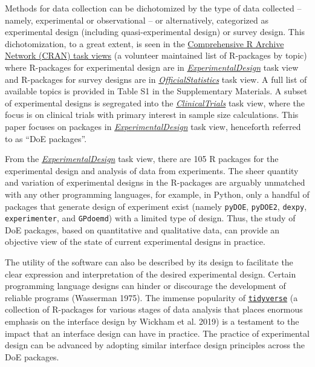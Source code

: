 \documentclass{article}
\begin{document}
Methods for data collection can be dichotomized by the type of data
collected -- namely, experimental or observational -- or alternatively,
categorized as experimental design (including quasi-experimental design)
or survey design. This dichotomization, to a great extent, is seen in
the \href{https://cran.r-project.org/web/views/}{Comprehensive R Archive
Network (CRAN) task views} (a volunteer maintained list of R-packages by
topic) where R-packages for experimental design are in
\href{http://CRAN.R-project.org/view=ExperimentalDesign}{\emph{ExperimentalDesign}}
task view and R-packages for survey designs are in
\href{http://CRAN.R-project.org/view=OfficialStatistics}{\emph{OfficialStatistics}}
task view. A full list of available topics is provided in Table S1 in
the Supplementary Materials. A subset of experimental designs is
segregated into the
\href{http://CRAN.R-project.org/view=ClinicalTrials}{\emph{ClinicalTrials}}
task view, where the focus is on clinical trials with primary interest
in sample size calculations. This paper focuses on packages in
\href{http://CRAN.R-project.org/view=ExperimentalDesign}{\emph{ExperimentalDesign}}
task view, henceforth referred to as ``DoE packages''.

From the
\href{http://CRAN.R-project.org/view=ExperimentalDesign}{\emph{ExperimentalDesign}}
task view, there are 105 R packages for the experimental design and
analysis of data from experiments. The sheer quantity and variation of
experimental designs in the R-packages are arguably unmatched with any
other programming languages, for example, in Python, only a handful of
packages that generate design of experiment exist (namely
\texttt{pyDOE}, \texttt{pyDOE2}, \texttt{dexpy}, \texttt{experimenter},
and \texttt{GPdoemd}) with a limited type of design. Thus, the study of
DoE packages, based on quantitative and qualitative data, can provide an
objective view of the state of current experimental designs in practice.

The utility of the software can also be described by its design to
facilitate the clear expression and interpretation of the desired
experimental design. Certain programming language designs can hinder or
discourage the development of reliable programs (Wasserman 1975). The
immense popularity of
\href{https://cran.r-project.org/web/packages/tidyverse/index.html}{\texttt{tidyverse}}
(a collection of R-packages for various stages of data analysis that
places enormous emphasis on the interface design by Wickham et al. 2019)
is a testament to the impact that an interface design can have in
practice. The practice of experimental design can be advanced by
adopting similar interface design principles across the DoE packages.
\end{document}
